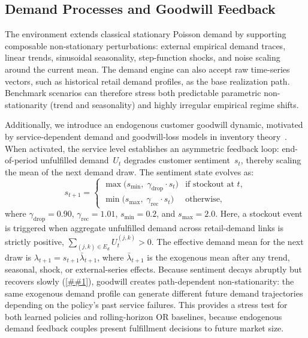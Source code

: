 \documentclass[10pt,a4paper]{article}
\providecommand{\Cref}[1]{\ref{##1}}
\begin{document}
\subsection{Demand Processes and Goodwill Feedback}

The environment extends classical stationary Poisson demand by
supporting composable non-stationary perturbations: external empirical
demand traces, linear trends, sinusoidal seasonality, step-function
shocks, and noise scaling around the current mean. The demand engine can
also accept raw time-series vectors, such as historical retail demand
profiles, as the base realization path. Benchmark scenarios can therefore
stress both predictable parametric non-stationarity (trend and seasonality)
and highly irregular empirical regime shifts.

Additionally, we introduce an endogenous customer goodwill dynamic,
motivated by service-dependent demand and goodwill-loss models in inventory
theory~\citep{schwartz1966,olsen2008}. When activated, the service level
establishes an asymmetric feedback loop:
end-of-period unfulfilled demand~$U_t$ degrades customer sentiment~$s_t$,
thereby scaling the mean of the next demand draw. The sentiment state
evolves as:
\begin{equation}\label{eq:goodwill}
  s_{t+1} =
  \begin{cases}
    \max\bigl(s_{\min},\;\gamma_{\text{drop}} \cdot s_t\bigr)
      & \text{if stockout at } t,\\
    \min\bigl(s_{\max},\;\gamma_{\text{rec}} \cdot s_t\bigr)
      & \text{otherwise,}
  \end{cases}
\end{equation}
where $\gamma_{\text{drop}} = 0.90$, $\gamma_{\text{rec}} = 1.01$,
$s_{\min} = 0.2$, and $s_{\max} = 2.0$. Here, a stockout event is
triggered when aggregate unfulfilled demand across retail-demand links is
strictly positive, $\sum_{(j,k)\in E_d} U_t^{(j,k)} > 0$. The effective
demand mean for the next draw is
$\lambda_{t+1}=s_{t+1}\bar{\lambda}_{t+1}$, where
$\bar{\lambda}_{t+1}$ is the exogenous mean after any trend, seasonal,
shock, or external-series effects. Because sentiment decays abruptly
but recovers slowly (\Cref{fig:goodwill_dynamics}), goodwill creates
path-dependent non-stationarity: the same exogenous demand profile can
generate different future demand trajectories depending on the policy's
past service failures. This provides a stress test for both learned
policies and rolling-horizon OR baselines, because endogenous demand
feedback couples present fulfillment decisions to future market size.
\end{document}
